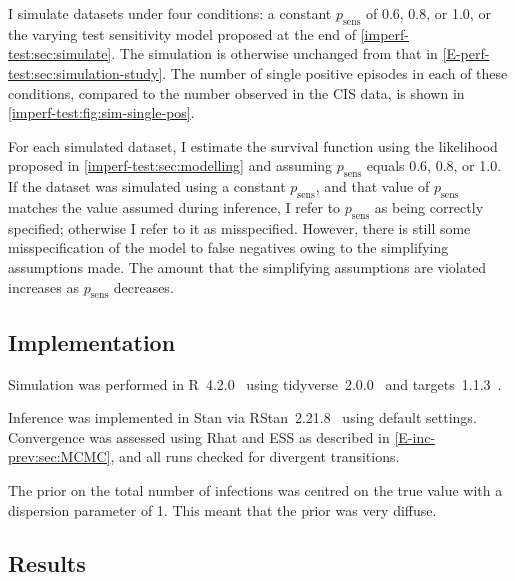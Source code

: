 \documentclass[12pt, letterpaper]{article} %
\newcommand{\psens}{p_\text{sens}}
\begin{document}
I simulate datasets under four conditions: a constant $\psens$ of 0.6, 0.8, or 1.0, or the varying test sensitivity model proposed at the end of \cref{imperf-test:sec:simulate}.
The simulation is otherwise unchanged from that in \cref{E-perf-test:sec:simulation-study}.
The number of single positive episodes in each of these conditions, compared to the number observed in the CIS data, is shown in \cref{imperf-test:fig:sim-single-pos}.

For each simulated dataset, I estimate the survival function using the likelihood proposed in \cref{imperf-test:sec:modelling} and assuming $\psens$ equals 0.6, 0.8, or 1.0.
If the dataset was simulated using a constant $\psens$, and that value of $\psens$ matches the value assumed during inference, I refer to $\psens$ as being correctly specified; otherwise I refer to it as misspecified.
However, there is still some misspecification of the model to false negatives owing to the simplifying assumptions made.
The amount that the simplifying assumptions are violated increases as $\psens$ decreases.

\subsection{Implementation}

Simulation was performed in R~4.2.0~\autocite{R-4-2-0} using tidyverse~2.0.0~\autocite{tidyverse} and targets~1.1.3~\autocite{targetsPackage}.

Inference was implemented in Stan via RStan~2.21.8~\autocite{rstan2-21-8} using default settings.
Convergence was assessed using Rhat and ESS as described in \cref{E-inc-prev:sec:MCMC}, and all runs checked for divergent transitions.

The prior on the total number of infections was centred on the true value with a dispersion parameter of 1.
This meant that the prior was very diffuse.

\subsection{Results}
\end{document}
